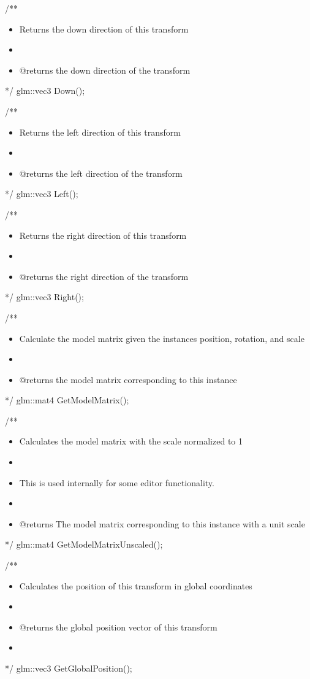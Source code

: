 \documentclass[11pt]{article}
\begin{document}
/**
\begin{itemize}
\item Returns the down direction of this transform
\item 

\item @returns the down direction of the transform
\end{itemize}
 */
glm::vec3 Down();

/**
\begin{itemize}
\item Returns the left direction of this transform
\item 

\item @returns the left direction of the transform
\end{itemize}
 */
glm::vec3 Left();

/**
\begin{itemize}
\item Returns the right direction of this transform
\item 

\item @returns the right direction of the transform
\end{itemize}
 */  
glm::vec3 Right();


/**
\begin{itemize}
\item Calculate the model matrix given the instances position, rotation, and scale
\item 

\item @returns the model matrix corresponding to this instance
\end{itemize}
 */
glm::mat4 GetModelMatrix();

/**
\begin{itemize}
\item Calculates the model matrix with the scale normalized to 1
\item 

\item This is used internally for some editor functionality.
\item 

\item @returns The model matrix corresponding to this instance with a unit scale
\end{itemize}
 */
glm::mat4 GetModelMatrixUnscaled();

/**
\begin{itemize}
\item Calculates the position of this transform in global coordinates
\item 

\item @returns the global position vector of this transform
\item 
\end{itemize}
 */
glm::vec3 GetGlobalPosition();
\end{document}
